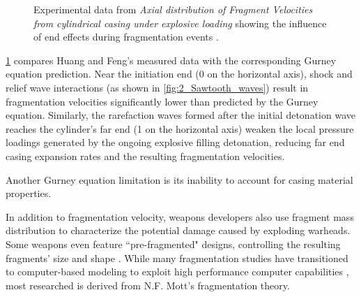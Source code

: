 \begin{figure}[H]
	\centering
    \caption{Experimental data from \textit{Axial distribution of Fragment Velocities from cylindrical casing under explosive loading} showing the influence of end effects during fragmentation events \cite{HuangEndEffects}.}
	\label{fig:2_end_effects}
\end{figure}
%
\cref{fig:2_end_effects} compares Huang and Feng's measured data with the corresponding Gurney equation prediction. Near the initiation end (0 on the horizontal axis), shock and relief wave interactions (as shown in \cref{fig:2_Sawtooth_waves}) result in fragmentation velocities significantly lower than predicted by the Gurney equation. Similarly, the rarefaction waves formed after the initial detonation wave reaches the cylinder's far end (1 on the horizontal axis) weaken the local pressure loadings generated by the ongoing explosive filling detonation, reducing far end casing expansion rates and the resulting fragmentation velocities.

Another Gurney equation limitation is its inability to account for casing material properties. 

\cite{WangDuctilityExpansion}


In addition to fragmentation velocity, weapons developers also use fragment mass distribution to characterize the potential damage caused by exploding warheads. Some weapons even feature ``pre-fragmented" designs, controlling the resulting fragments' size and shape \cite{DrielsWeaponeering}. While many fragmentation studies have transitioned to computer-based modeling to exploit high performance computer capabilities \cite{GrisaroFragmentVelocityDistribution,MarquetteEndEffects,MoxnesRingFragmentationSimulation}, most researched is derived from N.F. Mott's fragmentation theory. 
